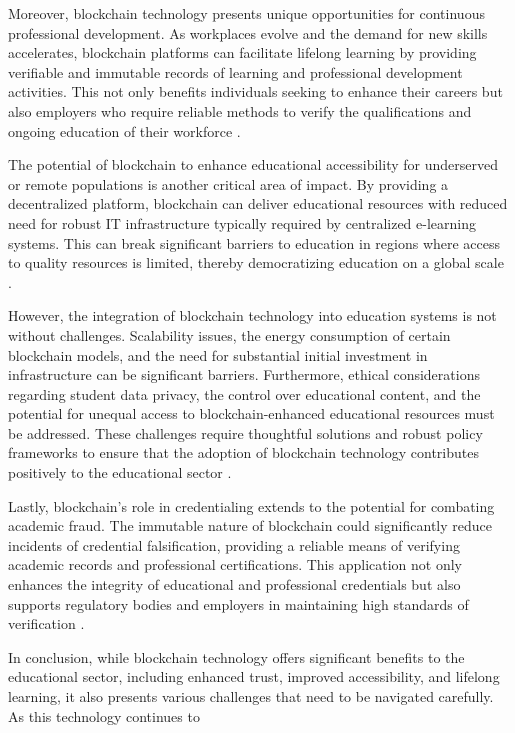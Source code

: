 \documentclass[12pt]{report}
\begin{document}
Moreover, blockchain technology presents unique opportunities for continuous professional development. As workplaces evolve and the demand for new skills accelerates, blockchain platforms can facilitate lifelong learning by providing verifiable and immutable records of learning and professional development activities. This not only benefits individuals seeking to enhance their careers but also employers who require reliable methods to verify the qualifications and ongoing education of their workforce \cite{professionalDevelopmentBlockchain}.

The potential of blockchain to enhance educational accessibility for underserved or remote populations is another critical area of impact. By providing a decentralized platform, blockchain can deliver educational resources with reduced need for robust IT infrastructure typically required by centralized e-learning systems. This can break significant barriers to education in regions where access to quality resources is limited, thereby democratizing education on a global scale \cite{accessibilityBlockchain}.

However, the integration of blockchain technology into education systems is not without challenges. Scalability issues, the energy consumption of certain blockchain models, and the need for substantial initial investment in infrastructure can be significant barriers. Furthermore, ethical considerations regarding student data privacy, the control over educational content, and the potential for unequal access to blockchain-enhanced educational resources must be addressed. These challenges require thoughtful solutions and robust policy frameworks to ensure that the adoption of blockchain technology contributes positively to the educational sector \cite{ethicalBlockchain}.

Lastly, blockchain's role in credentialing extends to the potential for combating academic fraud. The immutable nature of blockchain could significantly reduce incidents of credential falsification, providing a reliable means of verifying academic records and professional certifications. This application not only enhances the integrity of educational and professional credentials but also supports regulatory bodies and employers in maintaining high standards of verification \cite{credentialBlockchain}.

In conclusion, while blockchain technology offers significant benefits to the educational sector, including enhanced trust, improved accessibility, and lifelong learning, it also presents various challenges that need to be navigated carefully. As this technology continues to
\end{document}
